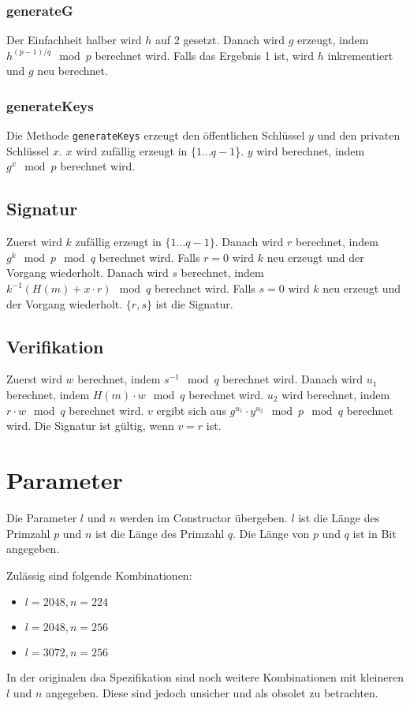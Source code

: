 \subsubsection{generateG}
Der Einfachheit halber wird $h$ auf 2 gesetzt. Danach wird $g$ erzeugt, indem $h^{(p-1)/q} \mod p$ berechnet wird. Falls das Ergebnis 1 ist, wird $h$ inkrementiert und $g$ neu berechnet.

\subsubsection{generateKeys}
Die Methode \texttt{generateKeys} erzeugt den öffentlichen Schlüssel $y$ und den privaten Schlüssel $x$. $x$ wird zufällig erzeugt in $\{1 ... q-1$\}. $y$ wird berechnet, indem $g^x \mod p$ berechnet wird.

\subsection{Signatur}
Zuerst wird $k$ zufällig erzeugt in $\{1 ... q-1\}$. Danach wird $r$ berechnet, indem $g^k \mod p \mod q$ berechnet wird. Falls $r = 0$ wird $k$ neu erzeugt und der Vorgang wiederholt. Danach wird $s$ berechnet, indem $k^{-1} (H(m) + x \cdot r) \mod q$ berechnet wird. Falls $s = 0$ wird $k$ neu erzeugt und der Vorgang wiederholt. $\{ r , s \}$ ist die Signatur.

\subsection{Verifikation}
Zuerst wird $w$ berechnet, indem $s^{-1} \mod q$ berechnet wird. Danach wird $u_1$ berechnet, indem $H(m) \cdot w \mod q$ berechnet wird. $u_2$ wird berechnet, indem $r \cdot w \mod q$ berechnet wird. $v$ ergibt sich aus $g^{u_1} \cdot y^{u_2} \mod p \mod q$ berechnet wird. Die Signatur ist gültig, wenn $v = r$ ist.

\section{Parameter}
Die Parameter $l$ und $n$ werden im Constructor übergeben. $l$ ist die Länge des Primzahl $p$ und $n$ ist die Länge des Primzahl $q$. Die Länge von $p$ und $q$ ist in Bit angegeben.

Zulässig sind folgende Kombinationen:
\begin{itemize}
    \item $l = 2048, n = 224$
    \item $l = 2048, n = 256$
    \item $l = 3072, n = 256$
\end{itemize}

In der originalen \gls{dsa} Spezifikation sind noch weitere Kombinationen mit kleineren $l$ und $n$ angegeben. Diese sind jedoch unsicher und als obsolet zu betrachten.

